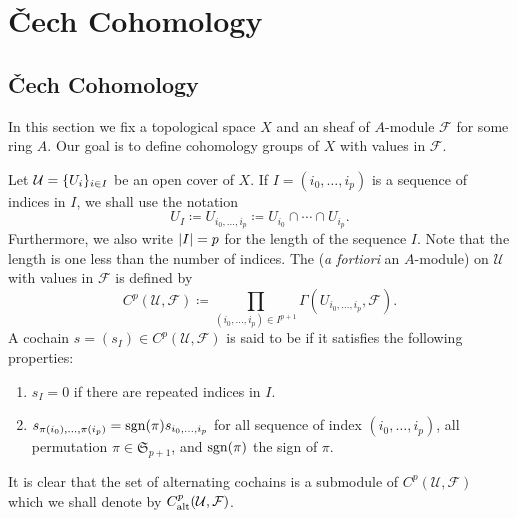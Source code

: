 \chapter{Čech Cohomology}

%


\section{Čech Cohomology}

In this section we fix a topological space $X$ and an sheaf of $A$-module $\mathcal{F}$ for some ring $A$. Our goal is to define cohomology groups of $X$ with values in $\mathcal{F}$. 

Let $\mathcal{U} = \lbrace U_i\rbrace_{i \in I}$ be an open cover of $X$. If $I = (i_0, \dotsc, i_p)$ is a sequence of indices in $I$, we shall use the notation
\begin{equation*}
	U_{I} \coloneqq U_{i_0, \dotsc ,i_p} \coloneqq U_{i_0} \cap \dotsb \cap U_{i_p}.
\end{equation*}
Furthermore, we also write $\lvert I\rvert = p$ for the length of the sequence $I$. Note that the length is one less than the number of indices. The  (\textit{a fortiori} an $A$-module) on $\mathcal{U}$ with values in $\mathcal{F}$ is defined by
\begin{equation*}
	C^p(\mathcal{U}, \mathcal{F}) \coloneqq \prod_{(i_0, \dotsc, i_p) \in I^{p + 1}} \Gamma(U_{i_0, \dotsc ,i_p}, \mathcal{F}).
\end{equation*}
A cochain $s = (s_I) \in C^p(\mathcal{U}, \mathcal{F})$ is said to be  if it satisfies the following properties:
\begin{enumerate}
	\item $s_{I} = 0$ if there are repeated indices in $I$.
	\item $s_{\pi(i_0), \dotsc, \pi(i_p)} = \operatorname{sgn}(\pi)s_{i_0, \dotsc, i_p}$ for all sequence of index $(i_0, \dotsc, i_p)$, all permutation $\pi \in \mathfrak{S}_{p + 1}$, and $\operatorname{sgn}(\pi)$ the sign of $\pi$.
\end{enumerate}
It is clear that the set of alternating cochains is a submodule of $C^p(\mathcal{U}, \mathcal{F})$ which we shall denote by $C^p_{\operatorname{alt}}(\mathcal{U}, \mathcal{F})$.

